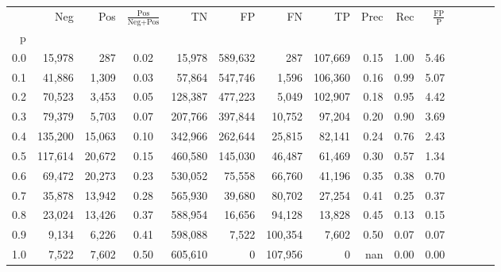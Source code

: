 \begin{tabular}{rrrcrrrrrrrrrrr}
\toprule
{} &      Neg &     Pos & $\frac{\text{Pos}}{\text{Neg}+\text{Pos}}$ &       TN &       FP &       FN &       TP &  Prec &   Rec & $\frac{\text{FP}}{\text{P}}$ \\
p   &          &         &                                            &          &          &          &          &       &       &                              \\
\midrule
0.0 &   15,978 &     287 &                                       0.02 &   15,978 &  589,632 &      287 &  107,669 &  0.15 &  1.00 &                         5.46 \\
0.1 &   41,886 &   1,309 &                                       0.03 &   57,864 &  547,746 &    1,596 &  106,360 &  0.16 &  0.99 &                         5.07 \\
0.2 &   70,523 &   3,453 &                                       0.05 &  128,387 &  477,223 &    5,049 &  102,907 &  0.18 &  0.95 &                         4.42 \\
0.3 &   79,379 &   5,703 &                                       0.07 &  207,766 &  397,844 &   10,752 &   97,204 &  0.20 &  0.90 &                         3.69 \\
0.4 &  135,200 &  15,063 &                                       0.10 &  342,966 &  262,644 &   25,815 &   82,141 &  0.24 &  0.76 &                         2.43 \\
0.5 &  117,614 &  20,672 &                                       0.15 &  460,580 &  145,030 &   46,487 &   61,469 &  0.30 &  0.57 &                         1.34 \\
0.6 &   69,472 &  20,273 &                                       0.23 &  530,052 &   75,558 &   66,760 &   41,196 &  0.35 &  0.38 &                         0.70 \\
0.7 &   35,878 &  13,942 &                                       0.28 &  565,930 &   39,680 &   80,702 &   27,254 &  0.41 &  0.25 &                         0.37 \\
0.8 &   23,024 &  13,426 &                                       0.37 &  588,954 &   16,656 &   94,128 &   13,828 &  0.45 &  0.13 &                         0.15 \\
0.9 &    9,134 &   6,226 &                                       0.41 &  598,088 &    7,522 &  100,354 &    7,602 &  0.50 &  0.07 &                         0.07 \\
1.0 &    7,522 &   7,602 &                                       0.50 &  605,610 &        0 &  107,956 &        0 &   nan &  0.00 &                         0.00 \\
\bottomrule
\end{tabular}
